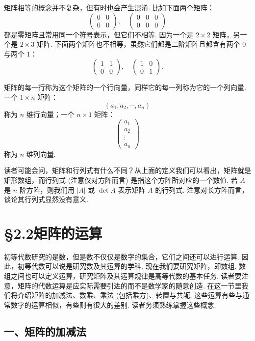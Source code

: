 \documentclass[UTF8,12pt,a4paper,fontset=fandol]{ctexart}
\begin{document}
矩阵相等的概念并不复杂，但有时也会产生混淆. 比如下面两个矩阵：
\[
\left(\begin{array}{cc}
0 & 0\\
0 & 0
\end{array}\right),\quad
\left(\begin{array}{ccc}
0 & 0 & 0\\
0 & 0 & 0
\end{array}\right)
\]
都是零矩阵且常用同一个符号表示，但它们不相等. 因为一个是 $2\times 2$ 矩阵，另一个是 $2\times 3$ 矩阵. 下面两个矩阵也不相等，虽然它们都是二阶矩阵且都含有两个 $0$ 与两个 $1$：
\[
\left(\begin{array}{cc}
1 & 1\\
0 & 0
\end{array}\right),\quad
\left(\begin{array}{cc}
1 & 0\\
0 & 1
\end{array}\right).
\]

矩阵的每一行称为这个矩阵的一个行向量，同样它的每一列称为它的一个列向量. 一个 $1\times n$ 矩阵：
\[
(a_1,a_2,\cdots,a_n)
\]
称为 $n$ 维行向量；一个 $n\times 1$ 矩阵：
\[
\left(\begin{array}{c}
a_1\\
a_2\\
\vdots\\
a_n
\end{array}\right)
\]
称为 $n$ 维列向量.

读者可能会问，矩阵和行列式有什么不同？从上面的定义我们可以看出，矩阵就是矩形数组，而行列式 (注意仅对方阵而言) 是指这个方阵所对应的一个数值. 若 $A$ 是 $n$ 阶方阵，则我们用 $|A|$ 或 $\det A$ 表示矩阵 $A$ 的行列式. 注意对长方阵而言，谈论其行列式显然没有意义.

\section*{§2.2\quad 矩阵的运算}

初等代数研究的是数，但是数不仅仅是数字的集合，它们之间还可以进行运算. 因此，初等代数可以说是研究数及其运算的学科. 现在我们要研究矩阵，即数组. 数组之间也可以定义运算，研究矩阵及其运算规律是高等代数的基本任务. 读者要注意，矩阵的代数运算是应实际需要引进的而不是数学家的随意创造. 在这一节里我们将介绍矩阵的加减法、数乘、乘法 (包括乘方)、转置与共轭. 这些运算有些与通常数字的运算相似，有些则有很大的差别. 读者务须熟练掌握这些概念.

\subsection*{一、矩阵的加减法}
\end{document}

